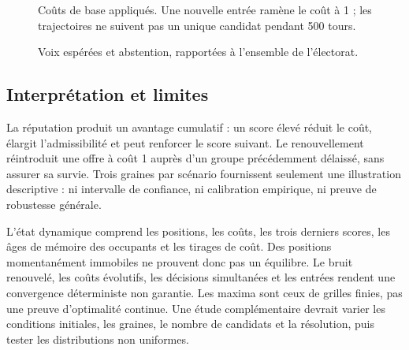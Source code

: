 \documentclass[11pt,a4paper]{article}
\begin{document}
\begin{figure}[htbp]\centering
{}
\caption{Coûts de base appliqués. Une nouvelle entrée ramène le coût à 1 ;
les trajectoires ne suivent pas un unique candidat pendant 500 tours.}
\end{figure}

\begin{figure}[htbp]\centering
{}
\caption{Voix espérées et abstention, rapportées à l'ensemble de l'électorat.}
\end{figure}
\clearpage

\subsection{Interprétation et limites}
La réputation produit un avantage cumulatif : un score élevé réduit le
coût, élargit l'admissibilité et peut renforcer le score suivant.
Le renouvellement réintroduit une offre à coût 1 auprès d'un groupe
précédemment délaissé, sans assurer sa survie.
Trois graines par scénario fournissent seulement une illustration
descriptive : ni intervalle de confiance, ni calibration empirique,
ni preuve de robustesse générale.

L'état dynamique comprend les positions, les coûts, les trois derniers
scores, les âges de mémoire des occupants et les tirages de coût.
Des positions momentanément immobiles ne prouvent donc pas un équilibre.
Le bruit renouvelé, les coûts évolutifs, les décisions simultanées et
les entrées rendent une convergence déterministe non garantie.
Les maxima sont ceux de grilles finies, pas une preuve d'optimalité
continue. Une étude complémentaire devrait varier les conditions
initiales, les graines, le nombre de candidats et la résolution, puis
tester les distributions non uniformes.
\end{document}
